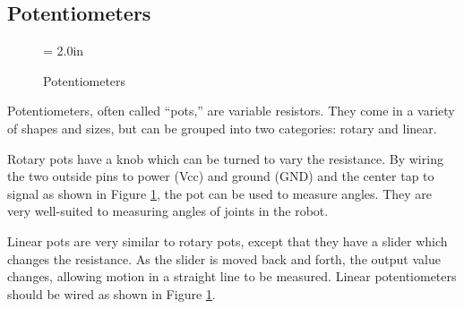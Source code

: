 \subsection{Potentiometers}

\begin{figure}[htbp]
 \centerline{\epsfysize = 2.0in}
 \caption{Potentiometers}
 \label{pot}
\end{figure}

Potentiometers, often called ``pots,'' are variable resistors. They come in a variety of shapes and sizes, but can be grouped into two categories: rotary and linear.

Rotary pots have a knob which can be turned to vary the resistance. By wiring the two outside pins to power (Vcc) and ground (GND) and the center tap to signal as shown in Figure \ref{pot}, the pot can be used to measure angles. They are very well-suited to measuring angles of joints in the robot.

Linear pots are very similar to rotary pots, except that they have a slider which changes the resistance. As the slider is moved back and forth, the output value changes, allowing motion in a straight line to be measured. Linear potentiometers should be wired as shown in Figure \ref{pot}.
